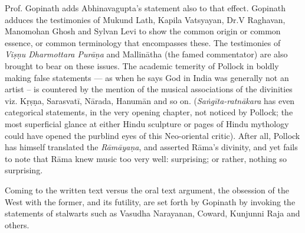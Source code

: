 Prof. Gopinath adds Abhinavagupta’s statement also to that effect. Gopinath adduces the testimonies of Mukund Lath, Kapila Vatsyayan, Dr.\@ V Raghavan, Manomohan Ghosh and Sylvan Levi to show the common origin or common essence, or common terminology that encompasses these. The testimonies of \textsl{Viṣṇu Dharmottara Purāṇa} and Mallinātha (the famed commentator) are also brought to bear on these issues. The academic temerity of Pollock in boldly making false statements --- as when he says God in India was generally not an artist -- is countered by the mention of the musical associations of the divinities viz. Kṛṣṇa, Sarasvatī, Nārada, Hanumān and so on. (\textsl{Saṅgīta-ratnākara} has even categorical statements, in the very opening chapter, not noticed by Pollock; the most superficial glance at either Hindu sculpture or pages of Hindu mythology could have opened the purblind eyes of this Neo-oriental critic). After all, Pollock has himself translated the \textsl{Rāmāyaṇa}, and asserted Rāma’s divinity, and yet fails to note that Rāma knew music too very well: surprising; or rather, nothing so surprising.

Coming to the written text versus the oral text argument, the obsession of the West with the former, and its futility, are set forth by Gopinath by invoking the statements of stalwarts such as Vasudha Narayanan, Coward, Kunjunni Raja and others.

